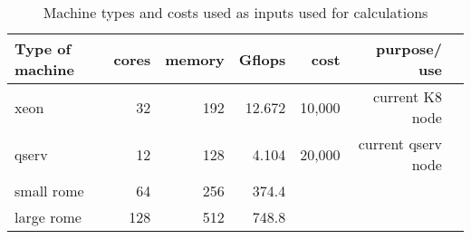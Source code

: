 \tiny \begin{longtable} { |p{}  |r  |r  |r  |r  |r  |r |} 
\caption{Machine types and costs used as inputs used for calculations \label{tab:Machines}}\\ 
\hline 
{Type of machine }&{cores}&{memory}&{Gflops }&{cost }&{purpose/ use } \\ \hline
{xeon }&{32}&{192}&{12.672}&{10,000}&{current K8 node } \\ \hline
{qserv }&{12}&{128}&{4.104}&{20,000}&{current qserv node } \\ \hline
{small rome  }&{64}&{256}&{374.4}&& \\ \hline
{large rome }&{128}&{512}&{748.8}&& \\ \hline
\end{longtable} \normalsize
